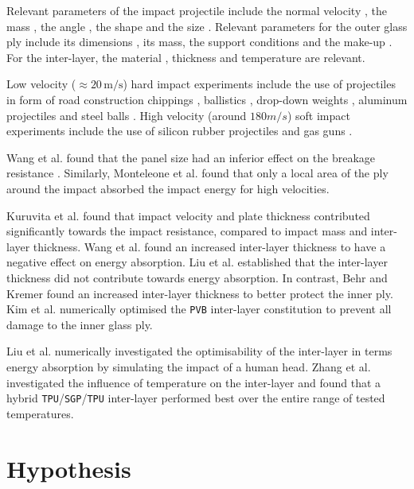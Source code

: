 \documentclass[12pt,twoside]{article}
\theoremstyle{break}
\begin{document}
\bigbreak
Relevant parameters of the impact projectile include the normal velocity \cite{Gra98, Kur14, Dar13, Wu14}, the mass \cite{Kur14, Dar13}, the angle \cite{Gra98, Kur14, Dar13}, the shape \cite{Dar13} and the size \cite{Wu14}. Relevant parameters for the outer glass ply include its dimensions \cite{Wan18}, its mass, the support conditions \cite{Wan18} and the make-up \cite{Wan18}. For the inter-layer, the material \cite{Moh18, Wan18, Mon04}, thickness \cite{Ji98, Kur14, Wan18} and temperature \cite{Moh18, Zha19} are relevant.

\bigbreak
Low velocity ($\approx 20\,\mathrm{m}/\mathrm{s}$) hard impact experiments include the use of projectiles in form of road construction chippings \cite{Gra98}, ballistics \cite{Mon04}, drop-down weights \cite{Che15, Mil12, Wan18}, aluminum projectiles \cite{Mil12} and steel balls \cite{Beh99, Flo98, Wan18}. High velocity (around $180 m/s$) soft impact experiments include the use of silicon rubber projectiles \cite{Moh17} and gas guns \cite{Moh18}.

\bigbreak
Wang et al. \cite{Wan18} found that the panel size had an inferior effect on the breakage resistance \cite{Wan18}. Similarly, Monteleone et al. \cite{Mon04} found that only a local area of the ply around the impact absorbed the impact energy for high velocities.

\bigbreak
Kuruvita et al. \cite{Kur14} found that impact velocity and plate thickness contributed significantly towards the impact resistance, compared to impact mass and inter-layer thickness. Wang et al. \cite{Wan18} found an increased inter-layer thickness to have a negative effect on energy absorption. Liu et al. \cite{Liu16} established that the inter-layer thickness did not contribute towards energy absorption. In contrast, Behr and Kremer \cite{Beh99} found an increased inter-layer thickness to better protect the inner ply. Kim et al. \cite{Kim16} numerically optimised the \texttt{PVB} inter-layer constitution to prevent all damage to the inner glass ply.

\bigbreak
Liu et al. \cite{Liu16} numerically investigated the optimisability of the inter-layer in terms energy absorption by simulating the impact of a human head. Zhang et al. \cite{Zha19} investigated the influence of temperature on the inter-layer and found that a hybrid \texttt{TPU}/\texttt{SGP}/\texttt{TPU} inter-layer performed best over the entire range of tested temperatures.

\section{Hypothesis}
\end{document}
